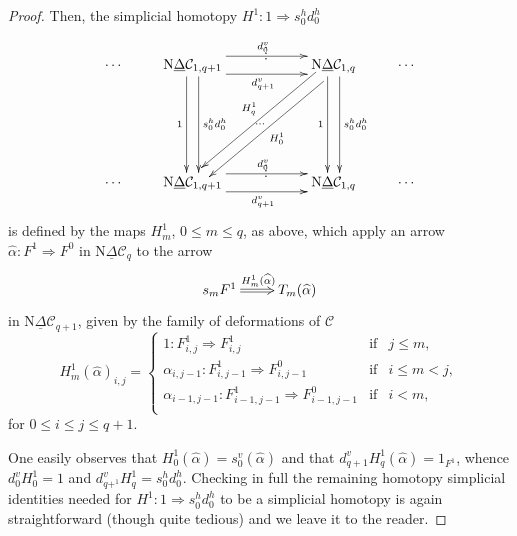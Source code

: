 \documentclass[]{amsart}
\begin{document}
\begin{proof}
Then, the simplicial homotopy $H^1:1\Rightarrow  s_0^hd_0^h$
$$ \xymatrix{\cdots & {\ensuremath{\mathrm{N}}}{\ensuremath{\underline{\Delta}}}{\ensuremath{\mathcal{C}}}_{1,q+1} \ar@<1.5ex>[rr]^{d_0^v} \ar@<-1.5ex>[rr]_{d_{q+1}^v}
\ar@<1ex>[dd]^{s_0^hd_0^h} \ar@<-1ex>[dd]_{1} & {}^{^{\vdots}} &
{\ensuremath{\mathrm{N}}}{\ensuremath{\underline{\Delta}}}{\ensuremath{\mathcal{C}}}_{1,q}\ar@<1ex>[dd]^{s_0^hd_0^h} \ar@<-1ex>[dd]_{1}
\ar@<1ex>[ddll]^{H_0^1}_{\ \ \dots}\ar@<-1ex>[ddll]_{H_q^1} & \cdots \\
&&&&\\
\cdots & {\ensuremath{\mathrm{N}}}{\ensuremath{\underline{\Delta}}}{\ensuremath{\mathcal{C}}}_{1,q+1} \ar@<1.5ex>[rr]^{d_0^v} \ar@<-1.5ex>[rr]_{d_{q+1}^v}
&{}^{^{\vdots}}&{\ensuremath{\mathrm{N}}} {\ensuremath{\underline{\Delta}}}{\ensuremath{\mathcal{C}}}_{1,q} &
\cdots\\
}
$$
is defined by the maps $H^1_m$, $0\leq m \leq q$, as above, which apply an arrow
$\widehat{\alpha}:F^1\Rightarrow F^0$ in ${\ensuremath{\mathrm{N}}}{\ensuremath{\underline{\Delta}}}{\ensuremath{\mathcal{C}}}_q$ to the arrow
\begin{equation}\label{hhat} \xymatrix{s_mF^1\ar@{=>}[r]^{H_m^1(\widehat{\alpha})}& T_m(\widehat{\alpha})}\end{equation}
in ${\ensuremath{\mathrm{N}}}{\ensuremath{\underline{\Delta}}}{\ensuremath{\mathcal{C}}}_{q+1}$, given by the family of deformations of ${\ensuremath{\mathcal{C}}}$
$$
H_m^1(\widehat{\alpha})_{i,j}=\left\{\begin{array}{lll}
    1:F_{i,j}^1\Rightarrow F_{i,j}^1& \text{if} & j\leq m, \\[4pt]
    \alpha_{i,j-1}:F_{i,j-1}^1\Rightarrow F_{i,j-1}^0 & \text{if} & i\leq m<j, \\[4pt]
     \alpha_{i-1,j-1}:F_{i-1,j-1}^1\Rightarrow F_{i-1,j-1}^0 & \text{if} & i<m, \\
\end{array}\right.
$$
for $0\leq i\leq j\leq q+1$.

One easily observes that $H_0^1(\widehat{\alpha})=s_0^v(\widehat{\alpha})$ and that
${d_{q+1}^vH_q^1(\widehat{\alpha})=1_{F^1}}$, whence $d_0^vH_0^1=1$ and
$d_{q+^1}^vH_q^1=s_0^hd_0^h$.  Checking in full the remaining homotopy simplicial identities needed
for $H^1:1\Rightarrow s_0^hd_0^h$ to be a simplicial homotopy is again straightforward (though
quite tedious) and we leave it to the reader.


\end{proof}
\end{document}
